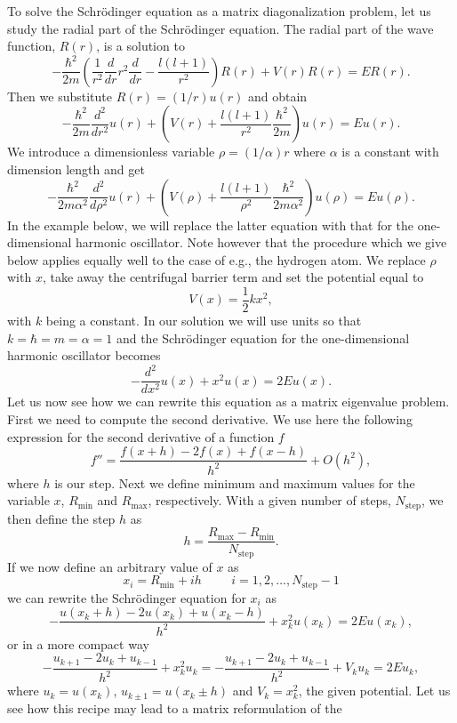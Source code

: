 To solve the Schr\"odinger equation as a matrix diagonalization problem,
let us study the radial part of the Schr\"odinger equation. 
The radial part of the wave function, $R(r)$, is a solution to  
%
\[
  -\frac{\hbar^2}{2 m} \left ( \frac{1}{r^2} \frac{d}{dr} r^2
  \frac{d}{dr} - \frac{l (l + 1)}{r^2} \right )R(r) 
     + V(r) R(r) = E R(r).
\]
%
Then we substitute $R(r) = (1/r) u(r)$ and obtain
%
\[
  -\frac{\hbar^2}{2 m} \frac{d^2}{dr^2} u(r) 
       + \left ( V(r) + \frac{l (l + 1)}{r^2}\frac{\hbar^2}{2 m}
                                    \right ) u(r)  = E u(r) .
\]
%
We introduce a dimensionless variable $\rho = (1/\alpha) r$
where $\alpha$ is a constant with dimension length and get
% 
\[
  -\frac{\hbar^2}{2 m \alpha^2} \frac{d^2}{d\rho^2} u(r) 
       + \left ( V(\rho) + \frac{l (l + 1)}{\rho^2}
         \frac{\hbar^2}{2 m\alpha^2} \right ) u(\rho)  = E u(\rho) .
\]
%
In the example below, we will replace 
the latter equation with that for the one-dimensional
harmonic oscillator. Note however that the procedure
which we give below applies equally well to the case of e.g., 
the hydrogen atom.
We replace $\rho$ with $x$, take away the 
centrifugal barrier term and set the potential equal to
\[
   V(x)=\frac{1}{2}kx^2,
\]
with  $k$ being a constant. In our solution we will use units so that
$k=\hbar=m=\alpha=1$ and the Schr\"odinger equation for the one-dimensional harmonic oscillator becomes
\[
  - \frac{d^2}{dx^2} u(x) +x^2u(x)  = 2E u(x).
\]
%
Let us now see how we can rewrite this equation as a matrix eigenvalue problem.
First we need to compute  the second derivative. We use here the
following expression for the second derivative of a function $f$
\[
    f''=\frac{f(x+h) -2f(x) +f(x-h)}{h^2} +O(h^2),
\]
where $h$ is our step.
Next we define minimum and maximum values for the variable $x$,
$R_{\mathrm{min}}$  and $R_{\mathrm{max}}$, respectively.
With a given number of steps, $N_{\mathrm{step}}$, we then 
define the step $h$ as
\[
  h=\frac{R_{\mathrm{max}}-R_{\mathrm{min}} }{N_{\mathrm{step}}}.
\]
If we now define an arbitrary value of $x$ as 
\[
    x_i= R_{\mathrm{min}} + ih \hspace{1cm} i=1,2,\dots , N_{\mathrm{step}}-1
\]
we can rewrite the Schr\"odinger equation for $x_i$ as
\[
-\frac{u(x_k+h) -2u(x_k) +u(x_k-h)}{h^2}+x_k^2u(x_k)  = 2E u(x_k),
\]
or in  a more compact way
\[
-\frac{u_{k+1} -2u_k +u_{k-1}}{h^2}+x_k^2u_k=-\frac{u_{k+1} -2u_k +u_{k-1} }{h^2}+V_ku_k  = 2E u_k,
\]
where $u_k=u(x_k)$, $u_{k\pm 1}=u(x_k\pm h)$ and $V_k=x_k^2$, the given potential.
Let us see how this recipe may lead to a matrix reformulation of the 

